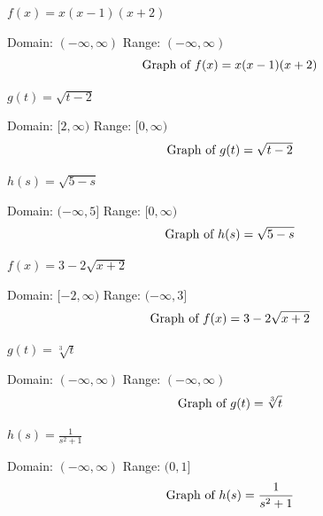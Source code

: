 \documentclass{ximera}
\begin{document}
\begin{question}
\begin{problem}
$f(x) = x(x-1)(x+2)$

\begin{solution}
Domain: $(-\infty, \infty)$ 
Range:  $(-\infty, \infty)$ 
$$\text{Graph of $f(x) = x(x-1)(x+2)$}$$
\end{solution}
\end{problem} 

\begin{problem}
$g(t) = \sqrt{t-2}$

\begin{solution}
Domain: $[2, \infty)$ 
Range:  $[0, \infty)$ 
$$\text{Graph of $g(t) = \sqrt{t-2}$}$$
\end{solution}
\end{problem} 

\begin{problem}
$h(s) = \sqrt{5 - s}$

\begin{solution}
Domain: $(-\infty,5]$ 
Range:  $[0, \infty)$ 
$$\text{Graph of $h(s) = \sqrt{5 - s}$}$$
\end{solution}
\end{problem} 

\begin{problem}
$f(x) = 3-2\sqrt{x+2}$

\begin{solution}
Domain: $[-2,\infty)$ 
Range:  $(-\infty,3]$ 
$$\text{Graph of $f(x) = 3-2\sqrt{x+2}$}$$
\end{solution}
\end{problem} 

\begin{problem}
$g(t) = \sqrt[3]{t}$

\begin{solution}
Domain: $(-\infty, \infty)$ 
Range:  $(-\infty, \infty)$  
$$\text{Graph of $g(t) = \sqrt[3]{t}$}$$
\end{solution}
\end{problem} 

\begin{problem}\label{sketchgraphlast}
$h(s) = \frac{1}{s^{2} + 1}$

\begin{solution}
Domain: $(-\infty, \infty)$ 
Range:  $(0,1]$  
$$\text{Graph of $h(s) = \frac{1}{s^{2} + 1}$}$$
\end{solution}
\end{problem} 

\end{question}
\end{document}
